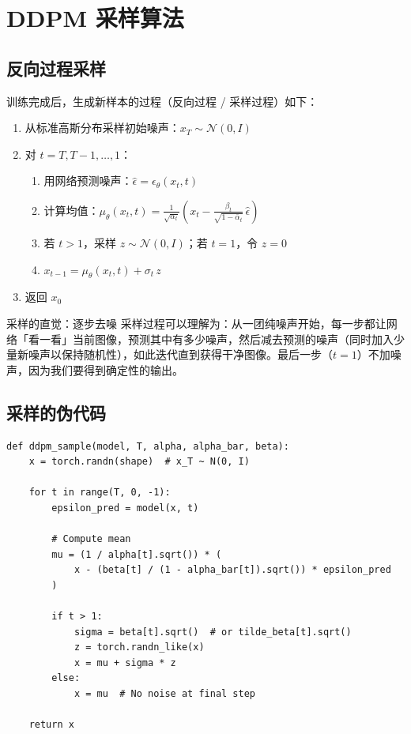 \section{DDPM 采样算法}

\subsection{反向过程采样}

训练完成后，生成新样本的过程（反向过程 / 采样过程）如下：

\begin{enumerate}
    \item 从标准高斯分布采样初始噪声：$x_T \sim \mathcal{N}(0, I)$
    \item 对 $t = T, T-1, \dots, 1$：
    \begin{enumerate}
        \item 用网络预测噪声：$\hat{\epsilon} = \epsilon_\theta(x_t, t)$
        \item 计算均值：$\mu_\theta(x_t, t) = \frac{1}{\sqrt{\alpha_t}}\left(x_t - \frac{\beta_t}{\sqrt{1-\bar{\alpha}_t}}\, \hat{\epsilon}\right)$
        \item 若 $t > 1$，采样 $z \sim \mathcal{N}(0, I)$；若 $t = 1$，令 $z = 0$
        \item $x_{t-1} = \mu_\theta(x_t, t) + \sigma_t\, z$
    \end{enumerate}
    \item 返回 $x_0$
\end{enumerate}

\begin{importantbox}{采样的直觉：逐步去噪}
采样过程可以理解为：从一团纯噪声开始，每一步都让网络「看一看」当前图像，预测其中有多少噪声，然后减去预测的噪声（同时加入少量新噪声以保持随机性），如此迭代直到获得干净图像。最后一步（$t=1$）不加噪声，因为我们要得到确定性的输出。
\end{importantbox}

\subsection{采样的伪代码}

\begin{lstlisting}[caption={DDPM 采样算法}, label=lst:sample]
def ddpm_sample(model, T, alpha, alpha_bar, beta):
    x = torch.randn(shape)  # x_T ~ N(0, I)

    for t in range(T, 0, -1):
        epsilon_pred = model(x, t)

        # Compute mean
        mu = (1 / alpha[t].sqrt()) * (
            x - (beta[t] / (1 - alpha_bar[t]).sqrt()) * epsilon_pred
        )

        if t > 1:
            sigma = beta[t].sqrt()  # or tilde_beta[t].sqrt()
            z = torch.randn_like(x)
            x = mu + sigma * z
        else:
            x = mu  # No noise at final step

    return x
\end{lstlisting}

